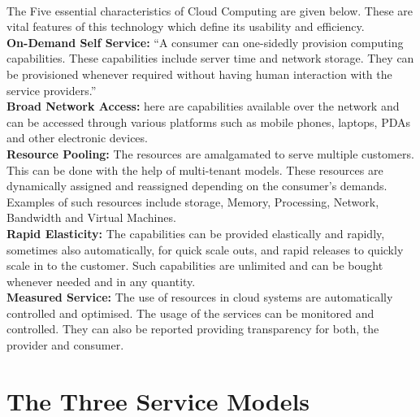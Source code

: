 \paragraph{\hspace{24pt}}
The Five essential characteristics of Cloud Computing are given below. These are vital features of this technology which define its usability and efficiency.\\
\textbf{On-Demand Self Service: } {“A consumer can one-sidedly provision computing capabilities. These capabilities include server time and network storage. They can be provisioned whenever required without having human interaction with the service providers.”}\\
\textbf{Broad Network Access:} {here are capabilities available over the network and can be accessed through various platforms such as mobile phones, laptops, PDAs and other electronic devices.}\\
\textbf{Resource Pooling:} {The resources are amalgamated to serve multiple customers. This can be done with the help of multi-tenant models. These resources are dynamically assigned and reassigned depending on the consumer’s demands. Examples of such resources include storage, Memory, Processing, Network, Bandwidth and Virtual Machines.}\\
\textbf{Rapid Elasticity:} {The capabilities can be provided elastically and rapidly, sometimes also automatically, for quick scale outs, and rapid releases to quickly scale in to the customer. Such capabilities are unlimited and can be bought whenever needed and in any quantity.}\\
\textbf{Measured Service:} {The use of resources in cloud systems are automatically controlled and optimised. The usage of the services can be monitored and controlled. They can also be reported providing transparency for both, the provider and consumer.}

\section{The Three Service Models}
